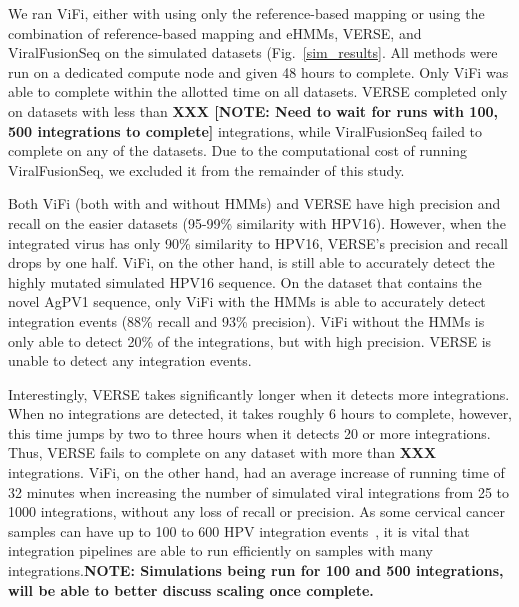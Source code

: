 \documentclass[10pt]{article}
\begin{document}
We ran ViFi, either with using only the reference-based mapping or using the combination of reference-based mapping and eHMMs, VERSE, and ViralFusionSeq on the simulated datasets (Fig.~\ref{sim_results}.  All methods were run on a dedicated compute node and given 48 hours to complete.  Only ViFi was able to complete within the allotted time on all datasets. VERSE completed only on datasets with less than \textbf{XXX [NOTE:  Need to wait for runs with 100, 500 integrations to complete]} integrations, while ViralFusionSeq failed to complete on any of the datasets.  Due to the computational cost of running ViralFusionSeq, we excluded it from the remainder of this study.

Both ViFi (both with and without HMMs) and VERSE have high precision and recall on the easier datasets (95-99\% similarity with HPV16).  However, when the integrated virus has only 90\% similarity to HPV16, VERSE's precision and recall drops by one half.  ViFi, on the other hand, is still able to accurately detect the highly mutated simulated HPV16 sequence.  On the dataset that contains the novel AgPV1 sequence, only ViFi with the HMMs is able to accurately detect integration events (88\% recall and 93\% precision).  ViFi without the HMMs is only able to detect 20\% of the integrations, but with high precision.  VERSE is unable to detect any integration events.  

Interestingly, VERSE takes significantly longer when it detects more integrations.  When no integrations are detected, it takes roughly 6 hours to complete, however, this time jumps by two to three hours when it detects 20 or more integrations.  Thus, VERSE fails to complete on any dataset with more than \textbf{XXX} integrations.  ViFi, on the other hand, had an average increase of running time of 32 minutes when increasing the number of simulated viral integrations from 25 to 1000 integrations, without any loss of recall or precision.  As some cervical cancer samples can have up to 100 to 600 HPV integration events~\cite{Hu2015}, it is vital that integration pipelines are able to run efficiently on samples with many integrations.\textbf{NOTE:  Simulations being run for 100 and 500 integrations, will be able to better discuss scaling once complete.}


\end{document}
